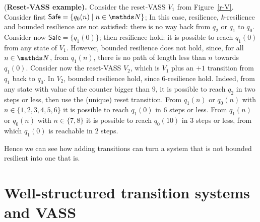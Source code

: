 \documentclass[runningheads]{llncs}
\newcommand{\Safe}{\textsf{Safe}}
\begin{document}
\begin{example}\label{Example}
{(\bf Reset-VASS example).}
Consider the 
 reset-VASS $V_1$ from Figure~\ref{r-V}.
Consider first $\Safe = \{q_0(n) \mid n \in \N\}$; In this case,  {resilience}, 
{$k$-resilience} and {bounded resilience} are not satisfied: there is no  way back from $q_2$ or $q_1$ to $q_0$. Consider now $\Safe = \{q_1(0)\} $; then {resilience} hold: it is possible to reach $q_1(0)$ from any state of $V_1$. However, {bounded resilience} does not hold, since, for all $n\in \N$, from $q_1(n)$, there is no path of length less than $n$ towards $q_1(0)$. Consider now the 
 reset-VASS $V_2$, which is $V_1$ plus an $+1$ transition from $q_1$ back to $q_0$. In $V_2$, {bounded resilience} hold, since $6$-resilience hold. 
Indeed, from any state with value of the counter bigger than $9$, it is possible to reach $q_2$ in two steps or less, then use the (unique) reset transition. From $q_1(n)$ or $q_0(n)$ with $n \in \{1, 2, 3, 4, 5, 6\}$ it is possible to reach $q_1(0)$ in $6$ steps or less. From 
$q_1(n)$ or $q_0(n)$ with $n \in \{7,8\}$ it is possible to reach $q_0(10)$ in $3$ steps or less, from which $q_1(0)$ is reachable in $2$ steps. 
\end{example}

Hence we can see how adding transitions can 
turn a system that is not bounded resilient into one that is. 





\section{Well-structured transition systems and VASS}\label{section definitions}
\end{document}
